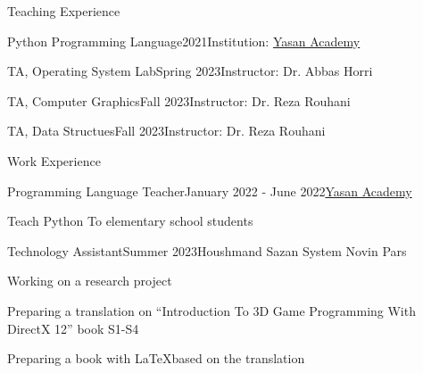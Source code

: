 \documentclass{resume} %
\begin{document}

    \begin{rSection}{Teaching Experience}
        \begin{rSubsection}{Python Programming Language}{2021}{Institution: \href{https://yasanacademy.ir}{Yasan Academy}}{ }
        \end{rSubsection}
        \begin{rSubsection}{TA, Operating System Lab}{Spring 2023}{Instructor: Dr. Abbas Horri}{ }
        \end{rSubsection}
        \begin{rSubsection}{TA, Computer Graphics}{Fall 2023}{Instructor: Dr. Reza Rouhani}{ }
        \end{rSubsection}
        \begin{rSubsection}{TA, Data Structues}{Fall 2023}{Instructor: Dr. Reza Rouhani}{ }
        \end{rSubsection}
    \end{rSection}

    \begin{rSection}{Work Experience}
        \begin{rSubsection}{Programming Language Teacher}{January 2022 - June 2022}{\href{https://yasanacademy.ir}{\textcolor{coolblack}{Yasan Academy}}}{ }
            \item Teach Python To elementary school students
        \end{rSubsection}
        \begin{rSubsection}{Technology Assistant}{Summer 2023}{Houshmand Sazan System Novin Pars}{ }
            \item Working on a research project
            \item Preparing a translation on \enquote{Introduction To 3D Game Programming With DirectX 12} book S1-S4
            \item Preparing a book with \LaTeX  based on the translation
        \end{rSubsection}
    \end{rSection}
\end{document}
